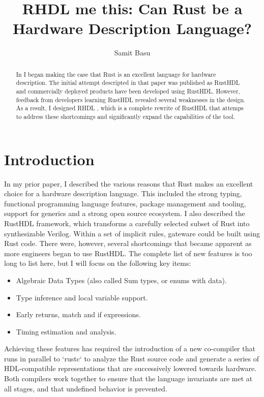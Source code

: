 \documentclass[sigplan,screen,sigconf]{acmart}
\author{Samit Basu}
\affiliation{
  basu.samit@gmail.com
  \country{Fremont CA, USA}
}
\begin{document}
\title{RHDL me this: Can Rust be a Hardware Description Language?}

\begin{abstract}
In \cite{b13} I began making the case that Rust is an excellent language for hardware description.  The initial attempt
descripted in that paper was published as RustHDL \cite{b6} and commercially deployed products have been developed using
RustHDL.  However, feedback from developers learning RustHDL revealed several weaknesses in the design.  As a result, 
I designed RHDL \cite{b10}, which is a complete rewrite of RustHDL that attemps to address these shortcomings and significantly 
expand the capabilities of the tool.
\end{abstract}

\maketitle

\section{Introduction}

In my prior paper, I described the various reasons that Rust makes an excellent choice for a hardware description language.  This included the strong typing, functional programming language features, package management and tooling, support for generics and a strong open source ecosystem. I also described the RustHDL framework, which transforms a carefully selected subset of Rust
into synthesizable Verilog.  Within a set of implicit rules, gateware could be built using Rust code.  There were, however, several shortcomings that became apparent as more engineers began to use RustHDL.  
The complete list of new features is too long to list here, but I will focus on the following key items:

\begin{itemize}
\item Algebraic Data Types (also called Sum types, or enums with data).
\item Type inference and local variable support.
\item Early returns, match and if expressions.
\item Timing estimation and analysis.
\end{itemize}

Achieving these features has required the introduction of a new co-compiler that runs in parallel to `rustc` to analyze the Rust source code and generate a series of HDL-compatible representations that are successively lowered towards hardware. Both compilers work together to ensure that the language invariants are met at all stages, and that undefined behavior is prevented.
\end{document}
